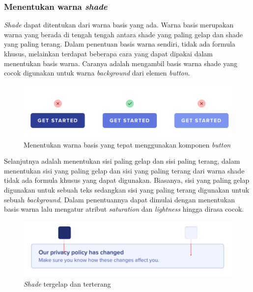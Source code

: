 \subsubsection{Menentukan warna \textit{shade}} \textit{Shade} dapat ditentukan dari warna basis yang ada. Warna basis merupakan warna yang berada di tengah tengah antara shade yang paling gelap dan shade yang paling terang. Dalam penentuan basis warna sendiri, tidak ada formula khusus, melainkan terdapat beberapa cara yang dapat dipakai dalam menentukan basis warna. Caranya adalah mengambil basis warna shade yang cocok digunakan untuk warna \textit{background} dari elemen \textit{button}.
\begin{figure}[H]
	{\centering
		\includegraphics[keepaspectratio, width=12cm]{gambar/refactoring-ui-g40.png}
		\caption{Menentukan warna basis yang tepat menggunakan komponen \textit{button} \citep{refactoringui}}}
	\label{gambar:refactoring-ui-g40.png}
\end{figure}

Selanjutnya adalah menentukan sisi paling gelap dan sisi paling terang, dalam menentukan sisi yang paling gelap dan sisi yang paling terang dari warna shade tidak ada formula khusus yang dapat digunakan. Biasanya, sisi yang paling gelap digunakan untuk sebuah teks sedangkan sisi yang paling terang digunakan untuk sebuah \textit{background}. Dalam penentuannya dapat dimulai dengan menentukan basis warna lalu mengatur atribut \textit{saturation} dan \textit{lightness} hingga dirasa cocok.

\begin{figure}[H]
	{\centering
		\includegraphics[keepaspectratio, width=12cm]{gambar/refactoring-ui-41.png}
		\caption{\textit{Shade} tergelap dan terterang \citep{refactoringui}}}
	\label{gambar:refactoring-ui-41.png}
\end{figure}

